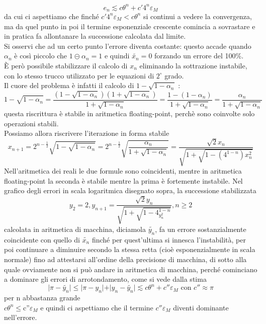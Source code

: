 \documentclass[12pt]{article}
\begin{document}
\begin{equation}
     e_{n} \lesssim c\theta^{n} + c'4^{n}\varepsilon_{M}
\end{equation}
da cui ci aspettiamo che finché $c'4^{n}\varepsilon_{M}<c\theta^{n}$ si continui a vedere la convergenza, ma da quel punto in poi il termine esponenziale crescente comincia a sovrastare e in pratica fa allontanare la successione calcolata dal limite. \\
Si osservi che ad un certo punto l'errore diventa costante: questo accade quando $\alpha_{n}$ è così piccolo che $1\circleddash \alpha_{n} = 1$ e quindi $\widetilde{x_{n}}=0$ forzando un errore del 100\%.\\
È però possibile stabilizzare il calcolo di $x_{n}$ eliminando la sottrazione instabile, con lo stesso trucco utilizzato per le equazioni di $2^\circ$ grado. \\
Il cuore del problema è infatti il calcolo di  $1-\sqrt{1-\alpha_{n}}$ :
\begin{equation}
     1-\sqrt{1-\alpha_{n}}=\frac{(1-\sqrt{1-\alpha_{n}})(1+\sqrt{1-\alpha_{n}})}{1+\sqrt{1-\alpha_{n}}} = \frac{1-(1-\alpha_{n})}{1+\sqrt{1-\alpha_{n}}} = \frac{\alpha_{n}}{1+\sqrt{1-\alpha_{n}}}
\end{equation}
questa riscrittura è stabile in aritmetica floating-point, perchè sono coinvolte solo operazioni stabili.\\
Possiamo allora riscrivere l'iterazione in forma stabile 
\begin{equation}
     x_{n+1}=2^{n-\frac{1}{2}}\sqrt{1-\sqrt{1-\alpha_{n}}}=2^{n-\frac{1}{2}}\sqrt{\frac{\alpha_{n}}{1+\sqrt{1-\alpha_{n}}}}=\frac{\sqrt{2}x_{n}}{\sqrt{1+\sqrt{1-(4^{1-n})x_{n}^{2}}}}
\end{equation}
Nell'aritmetica dei reali le due formule sono coincidenti, mentre in aritmetica floating-point la seconda è stabile mentre la prima è fortemente instabile. Nel grafico degli errori in
scala logaritmica disegnato sopra, la successione stabilizzata
\begin{equation}
    y_{2}=2,   y_{n+1}=\frac{\sqrt{2}y_{n}}{\sqrt{1+\sqrt{1-4^{1-n}_{y_{n}^{2}}}}}, n\geq2
\end{equation}
calcolata in aritmetica di macchina, diciamola $\widetilde{y_{n}}$, fa un errore sostanzialmente coincidente con quello di $\widetilde{x_{n}}$ finché per quest'ultima si innesca l'instabilità, per poi continuare a diminuire secondo la stessa retta (cioè esponenzialmente in scala normale) fino ad attestarsi all'ordine della
precisione di macchina, di sotto alla quale ovviamente non si può andare in aritmetica di macchina, perché cominciano a dominare gli errori di arrotondamento, come si vede dalla stima
\begin{equation}
    \vert \pi - \widetilde{y_{n}} \vert \leq \vert \pi - y_{n} \vert + \vert y_{n} - \widetilde{y_{n}} \vert \lesssim c\theta^{n}+c''\varepsilon_{M} \text{ con } c''\approx \pi
\end{equation}
per n abbastanza grande \\ $c\theta^{n}\leq$c''$\varepsilon_{M}$ e quindi ci aspettiamo che il termine $c''\varepsilon_{M}$ diventi dominante nell'errore.
\end{document}
